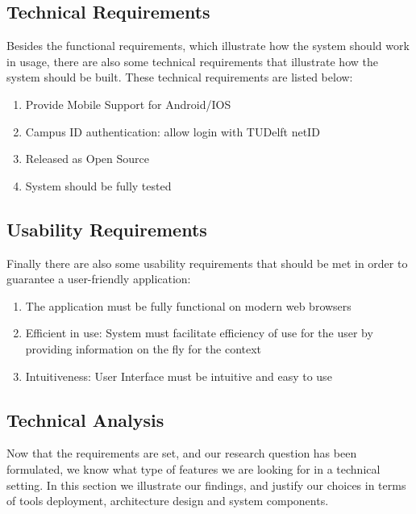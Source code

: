 \subsection{Technical Requirements} %
\label{sub:technical_requirements}

Besides the functional requirements, which illustrate how the system should work in usage, there are also some technical requirements that illustrate how the system should be built. These technical requirements are listed below:

\begin{enumerate}
	\item Provide Mobile Support for Android/IOS
	\item Campus ID authentication: allow login with TUDelft netID
	\item Released as Open Source
 	\item System should be fully tested 
\end{enumerate}

\subsection{Usability Requirements} %

Finally there are also some usability requirements that should be met in order to guarantee a user-friendly application:

\label{sub:usability_requirements}
\begin{enumerate}
	\item The application must be fully functional on modern web browsers
	\item Efficient in use: System must facilitate efficiency of use for the user by providing information on the fly for the context
	\item Intuitiveness: User Interface must be intuitive and easy to use
\end{enumerate}
\newpage
\subsection{Technical Analysis} %

Now that the requirements are set, and our research question has been formulated, we know what type of features we are looking for in a technical setting. In this section we illustrate our findings, and justify our choices in terms of tools deployment, architecture design and system components.


